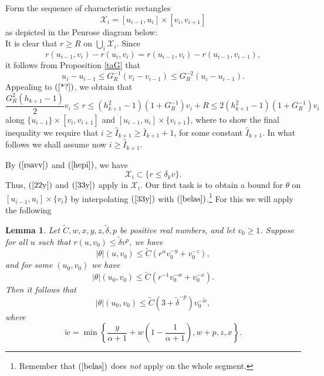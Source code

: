 \documentclass{article}
\newtheorem{lemma}{Lemma}[proposition]
\begin{document}
Form the sequence of characteristic
rectangles
\[
\mathcal{X}_i=[u_{i-1},u_{i}]\times[v_{i},v_{i+1}]
\]
as depicted in the Penrose diagram below:
\[

\]
It is clear that $r\ge R$ on $\bigcup_i\mathcal{X}_i$. 
Since 
\[
r(u_{i-1},v_i)-r(u_i,v_i)
=r(u_{i-1},v_i)-r(u_{i-1},v_{i-1}),
\]
it follows
from 
Proposition \ref{taG}
that 
\[
u_i-u_{i-1}\le G_R^{-1}(v_i-v_{i-1})\le G_R^{-2}(u_i-u_{i-1}).
\]
Appealing to $(\ref{*?})$, we obtain  that 
\begin{equation}
\label{rsavv}
\frac{G_R^2(h_{k+1}-1)}2v_i\le  r\le (h_{k+1}^2-1)(1+G_R^{-1})v_i+R
\le 2(h_{k+1}^2-1)(1+G_R^{-1})v_i
\end{equation}
along $\{u_{i-1}\}\times[v_i,v_{i+1}]$ and
$[u_{i-1},u_i]\times\{v_{i+1}\}$, where to show the final inequality
we require that $i\ge\hat{I}_{k+1}\ge\bar{I}_{k+1}+1$, 
for some constant $\hat{I}_{k+1}$. In what follows we shall 
assume now $i\ge\hat{I}_{k+1}$. 

By $(\ref{rsavv})$ and $(\ref{hepi})$, we have
\begin{equation}
\label{eivaimesa}
\mathcal{X}_i\subset\{r\le\delta_k v\}.
\end{equation}
Thus, $(\ref{22y})$ and $(\ref{33y})$ apply in $\mathcal{X}_i$. 
Our first task is to obtain a bound for $\theta$ on $[u_{i-1},u_i]\times\{v_i\}$
by interpolating $(\ref{33y})$ with $(\ref{belas})$.\footnote{Remember
that $(\ref{belas})$ does \emph{not} apply on the whole segment.}
For this we will apply the following
\begin{lemma}
\label{deutlemm}
Let $\tilde{C},w,x,y,z,\tilde{\delta}, p$ be positive real numbers, and let $v_0\ge1$.
Suppose for all $u$ such that $r(u,v_0)\le\tilde{\delta}v^p$, we have
\begin{equation}
\label{111}
|\theta|(u,v_0)\le \tilde{C}(r^{\alpha}v_0^{-y}+v_0^{-z}),
\end{equation}
and for some $(u_0,v_0)$ we have
\begin{equation}
\label{222}
|\theta|(u_0,v_0)\le \tilde{C}(r^{-1}v_0^{-w}+v_0^{-x}).
\end{equation}
Then it follows that
\begin{equation}
\label{333}
|\theta|(u_0,v_0)\le \tilde{C}(3+\tilde{\delta}^{-p})v_0^{-\tilde{w}},
\end{equation}
where
\[
\tilde{w}=\min\left\{\frac{y}{\alpha+1}+
w\left(1-\frac{1}{\alpha+1}\right),w+p,z,x\right\}.
\]
\end{lemma}
\end{document}
